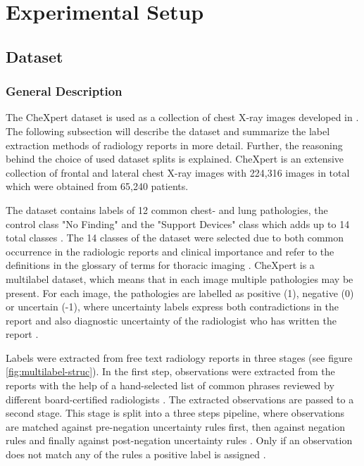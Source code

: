 \section{Experimental Setup}
\label{section: experimental-setup}
\subsection{Dataset}
\subsubsection{General Description}
\label{section: dataset}
The CheXpert dataset is used as a collection of chest X-ray images developed in \citep{Irvin2019}.
The following subsection will describe the dataset and summarize the label extraction methods of radiology reports in more detail.
Further, the reasoning behind the choice of used dataset splits is explained. 
CheXpert is an extensive collection of frontal and lateral chest X-ray images with 224,316 images in total which were obtained from 65,240 patients.
\par
The dataset contains labels of 12 common chest- and lung pathologies, the control class "No Finding" and the "Support Devices" class which adds up to 14 total classes \citep{Irvin2019}.
The 14 classes of the dataset were selected due to both common occurrence in the radiologic reports and clinical importance \citep{Irvin2019} and refer to the definitions in the glossary of terms for thoracic imaging \citep{Hansell2008}.   
CheXpert is a multilabel dataset, which means that in each image multiple pathologies may be present.
For each image, the pathologies are labelled as positive (1), negative (0) or uncertain (-1), where uncertainty labels express both contradictions in the report and also diagnostic uncertainty of the radiologist who has written the report \citep{Irvin2019}.
\par
Labels were extracted from free text radiology reports in three stages (see figure \ref{fig:multilabel-struc}).
In the first step, observations were extracted from the reports with the help of a hand-selected list of common phrases reviewed by different board-certified radiologists \citep{Irvin2019}.
The extracted observations are passed to a second stage.
This stage is split into a three steps pipeline, where observations are matched against pre-negation uncertainty rules first, then against negation rules and finally against post-negation uncertainty rules \citep{Irvin2019}.
Only if an observation does not match any of the rules a positive label is assigned \citep{Irvin2019}.
